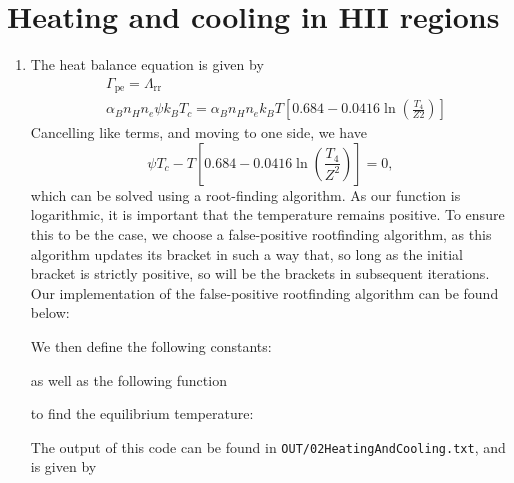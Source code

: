 \section{Heating and cooling in HII regions}
\begin{enumerate}[label=(\alph*)]
\item {
The heat balance equation is given by
\begin{align}
    &\Gamma_\text{pe} = \Lambda_\text{rr}\\
    &\alpha_B n_H n_e\psi k_B T_c = \alpha_B n_H n_e k_B T \left[0.684 - 0.0416\ln\left(\frac{T_4}{Z2}\right)\right]
\end{align}
Cancelling like terms, and moving to one side, we have
\begin{equation}
    \psi T_c - T \left[0.684 - 0.0416\ln\left(\frac{T_4}{Z^2}\right)\right] = 0,
\end{equation}
which can be solved using a root-finding algorithm. As our function is logarithmic, it is important that the temperature remains positive. To ensure this to be the case, we choose a false-positive rootfinding algorithm, as this algorithm updates its bracket in such a way that, so long as the initial bracket is strictly positive, so will be the brackets in subsequent iterations. Our implementation of the false-positive rootfinding algorithm can be found below:

We then define the following constants:

as well as the following function

to find the equilibrium temperature:

The output of this code can be found in \verb|OUT/02HeatingAndCooling.txt|, and is given by

}


\end{enumerate}
